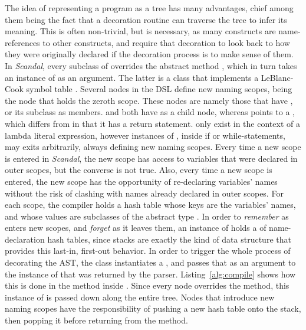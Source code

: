 The idea of representing a program as a tree has many advantages, chief among them being the fact that a decoration routine can traverse the tree to infer its meaning. This is often non-trivial, but is necessary, as many constructs are name-references to other constructs, and require that decoration to look back to how they were originally declared if the decoration process is to make sense of them. In \emph{Scandal}, every subclass of  overrides the abstract method , which in turn takes an instance of  as an argument. The latter is a class that implements a LeBlanc-Cook symbol table \cite{Cook1983}. Several nodes in the DSL define new naming scopes,  being the node that holds the zeroth scope. These nodes are namely those that have , or its subclass  as members.  and  both have  as a child node, whereas  points to a , which differs from  in that it has a return statement.  only exist in the context of a lambda literal expression, however instances of , inside if or while-statements, may exits arbitrarily, always defining new naming scopes. Every time a new scope is entered in \emph{Scandal}, the new scope has access to variables that were declared in outer scopes, but the converse is not true. Also, every time a new scope is entered, the new scope has the opportunity of re-declaring variables' names without the risk of clashing with names already declared in outer scopes. For each scope, the compiler holds a hash table whose keys are the variables' names, and whose values are subclasses of the abstract type . In order to \emph{remember} as  enters new scopes, and \emph{forget} as it leaves them, an instance of  holds a  of name-declaration hash tables, since stacks are exactly the kind of data structure that provides this last-in, first-out behavior. In order to trigger the whole process of decorating the AST, the  class instantiates a , and passes that as an argument to the instance of  that was returned by the parser. Listing~\ref{alg:compile} shows how this is done in the  method inside . Since every node overrides the  method, this instance of  is passed down along the entire tree. Nodes that introduce new naming scopes have the responsibility of pushing a new hash table onto the stack, then popping it before returning from the  method.

